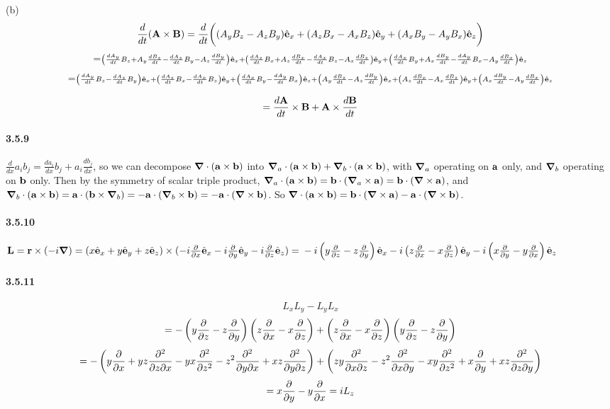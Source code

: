 \documentclass[a4paper]{article}
\begin{document}
(b) 
\[
\frac{d}{dt}(\V{A}\times\V{B})=\frac{d}{dt}\bigg( (A_yB_z-A_zB_y)\VE_x+(A_zB_x-A_xB_z)\VE_y+(A_xB_y-A_yB_x)\VE_z \bigg)
\]
\[
=
\scriptstyle\left(\dv{A_y}{t}B_z+A_y\dv{B_z}{t}-\dv{A_z}{t}B_y-A_z\dv{B_y}{t}\right)\VE_x+\left(\dv{A_z}{t}B_x+A_z\dv{B_x}{t}-\dv{A_x}{t}B_z-A_x\dv{B_z}{t}\right)\VE_y+\left(\dv{A_x}{t}B_y+A_x\dv{B_y}{t}-\dv{A_y}{t}B_x-A_y\dv{B_x}{t}\right)\VE_z
\]
\[
=
\scriptstyle\left(\dv{A_y}{t}B_z-\dv{A_z}{t}B_y\right)\VE_x+\left(\dv{A_z}{t}B_x-\dv{A_x}{t}B_z\right)\VE_y+\left(\dv{A_x}{t}B_y-\dv{A_y}{t}B_x\right)\VE_z+
\left(A_y\dv{B_z}{t}-A_z\dv{B_y}{t}\right)\VE_x+\left(A_z\dv{B_x}{t}-A_x\dv{B_z}{t}\right)\VE_y+\left(A_x\dv{B_y}{t}-A_y\dv{B_x}{t}\right)\VE_z
\]

\[
=\dv{\V{A}}{t}\times\V{B}+\V{A}\times\dv{\V{B}}{t}
\]

\paragraph{3.5.9}
$\frac{d}{dx}a_ib_j=\frac{da_i}{dx}b_j+a_i\frac{db_j}{dx}$, so we can decompose $\del\cdot(\V{a}\times\V{b})$ into $\del_a\cdot(\V{a}\times\V{b})+\del_b\cdot(\V{a}\times\V{b})$, with $\del_a$ operating on $\V{a}$ only, and $\del_b$ operating on $\V{b}$ only. Then by the symmetry of scalar triple product, $\del_a\cdot(\V{a}\times\V{b})=\V{b}\cdot(\del_a\times\V{a})=\V{b}\cdot(\del\times\V{a})$, and $\del_b\cdot(\V{a}\times\V{b})=\V{a}\cdot(\V{b}\times\del_b)=-\V{a}\cdot(\del_b\times\V{b})=-\V{a}\cdot(\del\times\V{b})$. So $\del\cdot(\V{a}\times\V{b})=\V{b}\cdot(\del\times\V{a})-\V{a}\cdot(\del\times\V{b})$.

\paragraph{3.5.10}
$\V{L}=\V{r}\times(-i\del)=(x\VE_x+y\VE_y+z\VE_z)\times(-i\pdv{}{x}\VE_x-i\pdv{}{y}\VE_y-i\pdv{}{z}\VE_z)=\\-i\left(y\pdv{}{z}-z\pdv{}{y} \right)\VE_x-i\left(z\pdv{}{x}-x\pdv{}{z} \right)\VE_y-i\left(x\pdv{}{y}-y\pdv{}{x} \right)\VE_z$

\paragraph{3.5.11}
\[L_xL_y-L_yL_x\]
\[
=-\left(y\pdv{}{z}-z\pdv{}{y} \right)\left(z\pdv{}{x}-x\pdv{}{z} \right)+\left(z\pdv{}{x}-x\pdv{}{z} \right)\left(y\pdv{}{z}-z\pdv{}{y} \right)
\]
\[
=-\left(y\pdv{}{x}+yz\ppdv{}{z}{x}-yx\pdv{^2}{z^2}-z^2\ppdv{}{y}{x}+xz\ppdv{}{y}{z} \right)+\left(zy\ppdv{}{x}{z}-z^2\ppdv{}{x}{y}-xy\pdv{^2}{z^2}+x\pdv{}{y}+xz\ppdv{}{z}{y} \right)
\]
\[
=x\pdv{}{y}-y\pdv{}{x}=iL_z
\]
\end{document}
